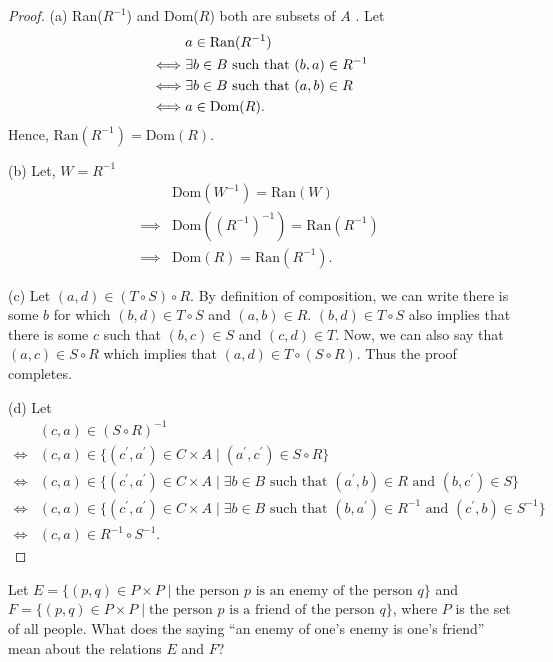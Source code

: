 \documentclass[12pt]{article}
\newenvironment{exercise}[2][Exercise]{\begin{trivlist}
\item[\hskip \labelsep {\bfseries #1}\hskip \labelsep {\bfseries #2.}]}{\end{trivlist}}
\newcommand{\nd}{\text{ and }}
\begin{document}
\begin{proof}
	(a) Ran(\( R^{-1} \)) and Dom(\( R \)) both are subsets of \( A \) . Let
	\begin{align*}
		& a\in \text{Ran(\( R^{-1} \))} \\
		\iff & \exists b\in B \text{ such that } (b,a)\in R^{-1} \\
		\iff & \exists b\in B \text{ such that } (a,b)\in R \\
		\iff & a\in \text{Dom(\( R \))}.
	\end{align*}
	Hence, \( \text{Ran}(R^{-1}) = \text{Dom}(R)   \).

	(b) Let, \( W=R^{-1} \) 
	\begin{align*}
		& \text{Dom}(W^{-1}) = \text{Ran}(W) \\
		\implies & \text{Dom}({(R^{-1})}^{-1}) = \text{Ran}(R^{-1}) \\
		\implies & \text{Dom}(R) = \text{Ran}(R^{-1}).
	\end{align*}

	(c) Let \( (a,d)\in (T\circ S)\circ R \). By definition of composition, we can write there is some $b$ for which $(b,d)\in T\circ S$ and $(a,b)\in R$. $(b,d)\in T\circ S$ also implies that there is some $c$ such that $(b,c)\in S$ and $(c,d)\in T$. Now, we can also say that $(a,c)\in S\circ R$ which implies that $(a,d)\in T\circ (S\circ R)$. Thus the proof completes.

	(d) Let
	\begin{align*}
		& (c,a)\in (S\circ R)^{-1} \\
		\iff & (c,a)\in \{(c^{\prime} ,a^{\prime} )\in C\times A\mid (a^{\prime} ,c^{\prime} )\in S\circ R\} \\
		\iff & (c,a) \in \{(c^{\prime} ,a^{\prime} )\in C\times A \mid 
		\exists b\in B \text{ such that } (a^{\prime} ,b)\in R \nd (b,c^{\prime} )\in S\} \\
		\iff & (c,a)\in \{(c^{\prime}, a^{\prime})\in C\times A\mid \exists b\in B \text{ such that } (b,a^{\prime} )\in R^{-1} \nd (c^{\prime} ,b)\in S^{-1}\} \\
		\iff & (c,a)\in R^{-1}\circ S^{-1}.
	\end{align*}
\end{proof}

\begin{exercise}
	{8}
	Let \( E = \{ (p, q) \in P \times P \mid \text{the person } p \text{ is an enemy of the person } q \} \) and \( F = \{ (p, q) \in P \times P \mid \text{the person } p \text{ is a friend of the person } q \} \), where \( P \) is the set of all people. What does the saying “an enemy of one’s enemy is one’s friend” mean about the relations \( E \) and \( F \)?
\end{exercise}
\end{document}
